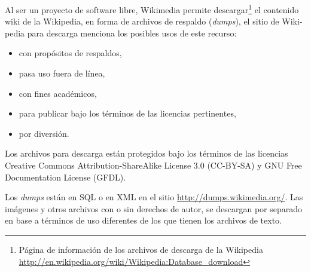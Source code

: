 \documentclass[letterpaper]{article}
\newcommand\textstylebibuscitbase[1]{#1}
\newcommand\liststyleLv{%
\renewcommand\labelitemi{{\textbullet}}
\renewcommand\labelitemii{{\textbullet}}
\renewcommand\labelitemiii{{\textbullet}}
\renewcommand\labelitemiv{{\textbullet}}
}
\begin{document}
\bigskip

{\sffamily
\textstylebibuscitbase{\foreignlanguage{spanish}{Al ser un proyecto de
software libre, Wikimedia permite descargar}}\footnote{P\'agina de
informaci\'on de los archivos de descarga de la Wikipedia
\url{http://en.wikipedia.org/wiki/Wikipedia:Database_download}}\textstylebibuscitbase{\foreignlanguage{spanish}{
el contenido wiki de la Wikipedia, en forma de archivos de respaldo
(}}\textstylebibuscitbase{\foreignlanguage{spanish}{\textit{dumps}}}\textstylebibuscitbase{\foreignlanguage{spanish}{),
el sitio de Wikipedia para descarga menciona los posibles usos de este
recurso:}}}


\bigskip

\liststyleLv
\begin{itemize}
\item {\sffamily
\textstylebibuscitbase{\foreignlanguage{spanish}{con prop\'ositos de
respaldos,}}}
\item {\sffamily
\textstylebibuscitbase{\foreignlanguage{spanish}{pasa uso fuera de
l\'inea,}}}
\item {\sffamily
\textstylebibuscitbase{\foreignlanguage{spanish}{con fines
acad\'emicos,}}}
\item {\sffamily
\textstylebibuscitbase{\foreignlanguage{spanish}{para publicar bajo los
t\'erminos de las licencias pertinentes,}}}
\item {\sffamily
\textstylebibuscitbase{\foreignlanguage{spanish}{por diversi\'on.}}}
\end{itemize}

\bigskip

{\sffamily
\textstylebibuscitbase{\foreignlanguage{spanish}{Los archivos para
descarga est\'an protegidos bajo los t\'erminos de las licencias
Creative Commons Attribution-ShareAlike License 3.0 (CC-BY-SA) y GNU
Free Documentation License (GFDL).}}}


\bigskip

{\sffamily
\textstylebibuscitbase{\foreignlanguage{spanish}{Los
}}\textstylebibuscitbase{\foreignlanguage{spanish}{\textit{dumps}}}\textstylebibuscitbase{\foreignlanguage{spanish}{
est\'an en SQL o en XML en el sitio
}}\url{http://dumps.wikimedia.org/}\textstylebibuscitbase{\foreignlanguage{spanish}{.
Las }}\textstylebibuscitbase{\foreignlanguage{spanish}{im\'agenes y
otros archivos con o sin derechos de autor, se descargan por separado
en base a t\'erminos de uso diferentes de los que tienen los archivos
de texto.}}}
\end{document}
